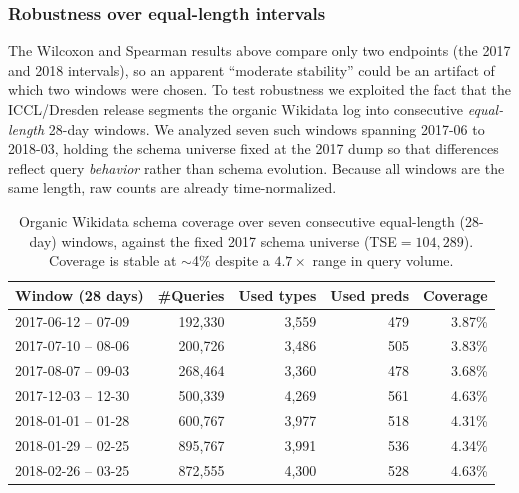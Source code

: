 \documentclass[sw]{iosart2x}
\begin{document}

\subsubsection{Robustness over equal-length intervals}\label{sec:equalintervals}
The Wilcoxon and Spearman results above compare only two endpoints (the 2017 and 2018 intervals), so an apparent ``moderate stability'' could be an artifact of which two windows were chosen. To test robustness we exploited the fact that the ICCL/Dresden release segments the organic Wikidata log into consecutive \emph{equal-length} 28-day windows. We analyzed seven such windows spanning 2017-06 to 2018-03, holding the schema universe fixed at the 2017 dump so that differences reflect query \emph{behavior} rather than schema evolution. Because all windows are the same length, raw counts are already time-normalized.

\begin{table}[ht]
\centering
\caption{Organic Wikidata schema coverage over seven consecutive equal-length (28-day) windows, against the fixed 2017 schema universe (TSE${=}104{,}289$). Coverage is stable at $\sim$4\% despite a $4.7\times$ range in query volume.}
\label{tab:temporaltraj}
\begin{tabular}{l|r|r|r|r}
\hline
Window (28 days) & \#Queries & Used types & Used preds & Coverage \\
\hline
2017-06-12 -- 07-09 & 192,330 & 3,559 & 479 & 3.87\% \\
2017-07-10 -- 08-06 & 200,726 & 3,486 & 505 & 3.83\% \\
2017-08-07 -- 09-03 & 268,464 & 3,360 & 478 & 3.68\% \\
2017-12-03 -- 12-30 & 500,339 & 4,269 & 561 & 4.63\% \\
2018-01-01 -- 01-28 & 600,767 & 3,977 & 518 & 4.31\% \\
2018-01-29 -- 02-25 & 895,767 & 3,991 & 536 & 4.34\% \\
2018-02-26 -- 03-25 & 872,555 & 4,300 & 528 & 4.63\% \\
\hline
\end{tabular}
\end{table}
\end{document}
